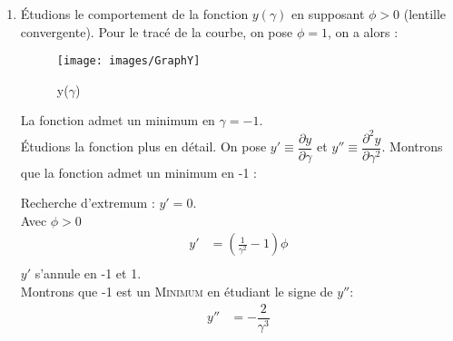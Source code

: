 \documentclass[12pt,a4paper]{article}
\begin{document}
\begin{enumerate}
		\vspace*{+1em}
		De plus on sait que : $\dfrac {\overline {AB}} {p}=\dfrac {\overline {A'B'}} {p'}\implies\dfrac{p'}{p}=\gamma$, ainsi :
		\begin{empheq}[left=\empheqlbrace]{align}
		y&=-\\
		p' &= -\phi()\\
		&=\gamma
		\end{empheq}
		En combinant (2) et (3), on obtient : $p=\dfrac{-\phi(\gamma - 1)}{\gamma}$. On injecte dans (1) :
		\begingroup
		\addtolength{\jot}{1em}
		\begin{align*}
		y&=-\dfrac{p^2}{p+\phi}\\
		&=\dfrac{\left( \phi\dfrac{\gamma-1}{\gamma}\right)^2}{\left(\phi\dfrac{\gamma-1}{\gamma}\right) -\dfrac{\phi \gamma}{\gamma}}\\
		&=\dfrac{\phi^2(\gamma-1)^2}{\gamma^2\dfrac{\phi}{\gamma}(\gamma-1-\gamma)}\\
		&=\dfrac{-\phi(\gamma-1)^2}{\gamma}
		\end{align*}
		\endgroup
		On a alors : $y=\dfrac{-\phi(\gamma-1)^2}{\gamma}$\\
		\item 
		Étudions le comportement de la fonction $y(\gamma)$ en supposant $\phi>0$ (lentille convergente). Pour le tracé de la courbe, on pose $\phi=1$, on a alors :
		\begin{figure}[h]
			\centering
			\caption[]{y($\gamma$)}
			\label{fig:graphy}
			\texttt{[image: images/GraphY]}
		\end{figure}
		La fonction admet un minimum en $\gamma=-1$.\\
		Étudions la fonction plus en détail. On pose $y'\equiv\dfrac {\partial y} {\partial \gamma }$ et $y''\equiv\dfrac {\partial^2 y} {\partial \gamma^2 }$. Montrons que la fonction admet un minimum en -1 :
		\begin{multicols}{2}
			Recherche d'extremum : $y'=0$.\\
			Avec $\phi>0$
			\begin{align*}
			y'&=\left(\frac{1}{\gamma ^2}-1\right) \phi\\
			\end{align*}
			$y'$ s'annule en -1 et 1.
			\setlength\columnseprule{0.4pt}
			\columnbreak
			\\
			Montrons que -1 est un \textsc{Minimum} en étudiant le signe de $y''$:
			\begin{align*}
			y''&=-\dfrac{2}{\gamma^3}\\

\end{align*}
\end{multicols}
\end{enumerate}
\end{document}
